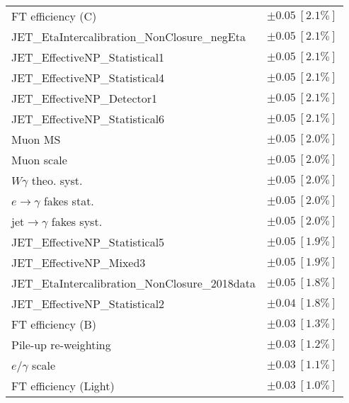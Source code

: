 \begin{tabular}{lr}
FT efficiency (C) & $\pm 0.05\ [2.1\%]$ \\
JET\_EtaIntercalibration\_NonClosure\_negEta & $\pm 0.05\ [2.1\%]$ \\
JET\_EffectiveNP\_Statistical1 & $\pm 0.05\ [2.1\%]$ \\
JET\_EffectiveNP\_Statistical4 & $\pm 0.05\ [2.1\%]$ \\
JET\_EffectiveNP\_Detector1 & $\pm 0.05\ [2.1\%]$ \\
JET\_EffectiveNP\_Statistical6 & $\pm 0.05\ [2.1\%]$ \\
Muon MS & $\pm 0.05\ [2.0\%]$ \\
Muon scale & $\pm 0.05\ [2.0\%]$ \\
$W\gamma$ theo. syst. & $\pm 0.05\ [2.0\%]$ \\
$e\to\gamma$ fakes stat. & $\pm 0.05\ [2.0\%]$ \\
jet$\to\gamma$ fakes syst. & $\pm 0.05\ [2.0\%]$ \\
JET\_EffectiveNP\_Statistical5 & $\pm 0.05\ [1.9\%]$ \\
JET\_EffectiveNP\_Mixed3 & $\pm 0.05\ [1.9\%]$ \\
JET\_EtaIntercalibration\_NonClosure\_2018data & $\pm 0.05\ [1.8\%]$ \\
JET\_EffectiveNP\_Statistical2 & $\pm 0.04\ [1.8\%]$ \\
FT efficiency (B) & $\pm 0.03\ [1.3\%]$ \\
Pile-up re-weighting & $\pm 0.03\ [1.2\%]$ \\
$e/\gamma$ scale & $\pm 0.03\ [1.1\%]$ \\
FT efficiency (Light) & $\pm 0.03\ [1.0\%]$ \\
\hline
\end{tabular}
